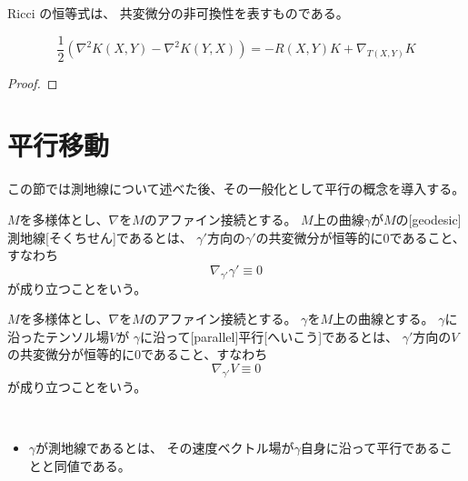 \documentclass[report]{jlreq}
\begin{document}
Ricci の恒等式は、
共変微分の非可換性を表すものである。

\begin{proposition}
    \begin{equation}
        \frac{1}{2}(\nabla^2 K(X, Y) - \nabla^2 K(Y, X))
            = -R(X, Y) K + \nabla_{T(X, Y)} K
    \end{equation}
    \TODO{}
\end{proposition}

\begin{proof}
    \TODO{}
\end{proof}


%
\section{平行移動}

この節では測地線について述べた後、その一般化として平行の概念を導入する。

\begin{definition}[測地線]
    $M$を多様体とし、$\nabla$を$M$のアファイン接続とする。
    $M$上の曲線$\gamma$が$M$の[geodesic]{測地線}[そくちせん]であるとは、
    $\gamma'$方向の$\gamma'$の共変微分が恒等的に$0$であること、すなわち
    \begin{equation}
        \nabla_{\gamma'} \gamma' \equiv 0
    \end{equation}
    が成り立つことをいう。
\end{definition}

\begin{example}[測地線の例]
    \TODO{}
\end{example}

\begin{definition}[平行]
    $M$を多様体とし、$\nabla$を$M$のアファイン接続とする。
    $\gamma$を$M$上の曲線とする。
    $\gamma$に沿ったテンソル場$V$が
    $\gamma$に沿って[parallel]{平行}[へいこう]であるとは、
    $\gamma'$方向の$V$の共変微分が恒等的に$0$であること、すなわち
    \begin{equation}
        \nabla_{\gamma'} V \equiv 0
    \end{equation}
    が成り立つことをいう。
\end{definition}

\begin{example}[平行なテンソル場の例]
    \TODO{}
    ~
    \begin{itemize}
        \item $\gamma$が測地線であるとは、
            その速度ベクトル場が$\gamma$自身に沿って平行であることと同値である。
    \end{itemize}
\end{example}
\end{document}
